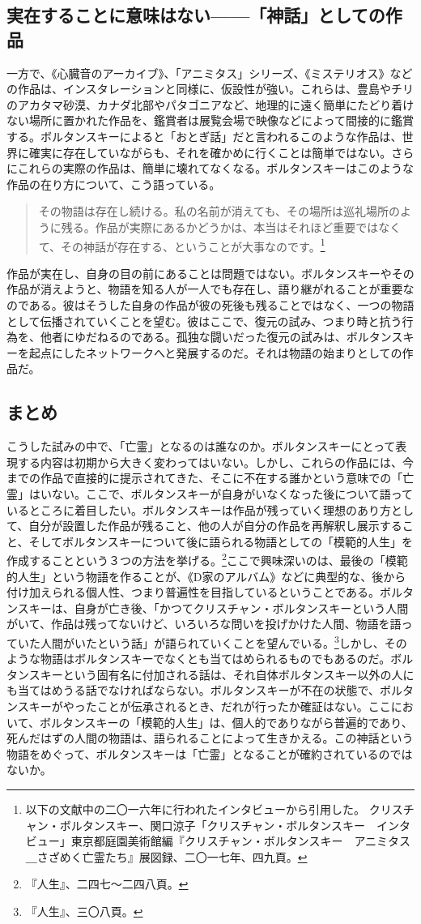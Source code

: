 \documentclass[b5j,twoside,twocolumn]{utarticle}
\newcommand{\mysubsection}[1]{\vspace{-6mm}\subsection{#1}\vspace{-2mm}}
\begin{document}
\mysubsection{実在することに意味はない\tbaselineshift =3.0pt------「神話」としての作品}
一方で、《心臓音のアーカイブ》、「アニミタス」シリーズ、《ミステリオス》などの作品は、インスタレーションと同様に、仮設性が強い。これらは、豊島やチリのアカタマ砂漠、カナダ北部やパタゴニアなど、地理的に遠く簡単にたどり着けない場所に置かれた作品を、鑑賞者は展覧会場で映像などによって間接的に鑑賞する。ボルタンスキーによると「おとぎ話」だと言われるこのような作品は、世界に確実に存在していながらも、それを確かめに行くことは簡単ではない。さらにこれらの実際の作品は、簡単に壊れてなくなる。ボルタンスキーはこのような作品の在り方について、こう語っている。
\begin{quote}
その物語は存在し続ける。私の名前が消えても、その場所は巡礼場所のように残る。作品が実際にあるかどうかは、本当はそれほど重要ではなくて、その神話が存在する、ということが大事なのです。\footnote{以下の文献中の二〇一六年に行われたインタビューから引用した。
クリスチャン・ボルタンスキー、関口涼子「クリスチャン・ボルタンスキー　インタビュー」東京都庭園美術館編『クリスチャン・ボルタンスキー　アニミタス＿さざめく亡霊たち』展図録、二〇一七年、四九頁。}
\end{quote}


作品が実在し、自身の目の前にあることは問題ではない。ボルタンスキーやその作品が消えようと、物語を知る人が一人でも存在し、語り継がれることが重要なのである。彼はそうした自身の作品が彼の死後も残ることではなく、一つの物語として伝播されていくことを望む。彼はここで、復元の試み、つまり時と抗う行為を、他者にゆだねるのである。孤独な闘いだった復元の試みは、ボルタンスキーを起点にしたネットワークへと発展するのだ。それは物語の始まりとしての作品だ。

\mysubsection{まとめ}
こうした試みの中で、「亡霊」となるのは誰なのか。ボルタンスキーにとって表現する内容は初期から大きく変わってはいない。しかし、これらの作品には、今までの作品で直接的に提示されてきた、そこに不在する誰かという意味での「亡霊」はいない。ここで、ボルタンスキーが自身がいなくなった後について語っているところに着目したい。ボルタンスキーは作品が残っていく理想のあり方として、自分が設置した作品が残ること、他の人が自分の作品を再解釈し展示すること、そしてボルタンスキーについて後に語られる物語としての「模範的人生」を作成することという３つの方法を挙げる。\footnote{『人生』、二四七～二四八頁。}ここで興味深いのは、最後の「模範的人生」という物語を作ることが、《D家のアルバム》などに典型的な、後から付け加えられる個人性、つまり普遍性を目指しているということである。ボルタンスキーは、自身が亡き後、「かつてクリスチャン・ボルタンスキーという人間がいて、作品は残ってないけど、いろいろな問いを投げかけた人間、物語を語っていた人間がいたという話」が語られていくことを望んでいる。\footnote{『人生』、三〇八頁。}しかし、そのような物語はボルタンスキーでなくとも当てはめられるものでもあるのだ。ボルタンスキーという固有名に付加される話は、それ自体ボルタンスキー以外の人にも当てはめうる話でなければならない。ボルタンスキーが不在の状態で、ボルタンスキーがやったことが伝承されるとき、だれが行ったか確証はない。ここにおいて、ボルタンスキーの「模範的人生」は、個人的でありながら普遍的であり、死んだはずの人間の物語は、語られることによって生きかえる。この神話という物語をめぐって、ボルタンスキーは「亡霊」となることが確約されているのではないか。
\end{document}
